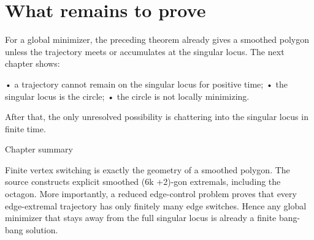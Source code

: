 \section{What remains to prove}

For a global minimizer, the preceding theorem already gives a smoothed polygon unless the trajectory meets or accumulates at the singular locus. The next chapter shows:


• a trajectory cannot remain on the singular locus for positive time; • the singular locus is the circle; • the circle is not locally minimizing.


After that, the only unresolved possibility is chattering into the singular locus in finite time.


\begin{insightbox}{Chapter summary}
\end{insightbox}

Finite vertex switching is exactly the geometry of a smoothed polygon. The source constructs explicit smoothed (6k +2)-gon extremals, including the octagon. More importantly, a reduced edge-control problem proves that every edge-extremal trajectory has only finitely many edge switches. Hence any global minimizer that stays away from the full singular locus is already a finite bang-bang solution.

